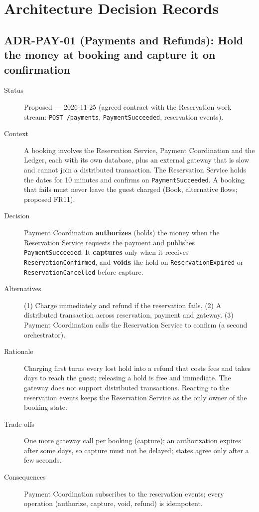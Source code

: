 \section{Architecture Decision Records}




\begingroup
\setlength{\emergencystretch}{3em}
\subsection{ADR-PAY-01 (Payments and Refunds): Hold the money at booking and capture it on confirmation}
\begin{description}
  \item[Status] Proposed --- 2026-11-25 (agreed contract with the Reservation
    work stream: \texttt{POST /payments}, \texttt{Payment\allowbreak Succeeded},
    reservation events).
  \item[Context] A booking involves the Reservation Service, Payment
    Coordination and the Ledger, each with its own database, plus an external
    gateway that is slow and cannot join a distributed transaction. The
    Reservation Service holds the dates for 10 minutes and confirms on
    \texttt{Payment\allowbreak Succeeded}. A booking that fails must never leave the
    guest charged (Book, alternative flows; proposed FR11).
  \item[Decision] Payment Coordination \textbf{authorizes} (holds) the money
    when the Reservation Service requests the payment and publishes
    \texttt{Payment\allowbreak Succeeded}. It \textbf{captures} only when it receives
    \texttt{Reservation\allowbreak Confirmed}, and \textbf{voids} the hold on
    \texttt{Reservation\allowbreak Expired} or \texttt{Reservation\allowbreak Cancelled} before
    capture.
  \item[Alternatives] (1) Charge immediately and refund if the reservation
    fails. (2) A distributed transaction across reservation, payment and
    gateway. (3) Payment Coordination calls the Reservation Service to
    confirm (a second orchestrator).
  \item[Rationale] Charging first turns every lost hold into a refund that
    costs fees and takes days to reach the guest; releasing a hold is free and
    immediate. The gateway does not support distributed transactions. Reacting
    to the reservation events keeps the Reservation Service as the only owner
    of the booking state.
  \item[Trade-offs] One more gateway call per booking (capture); an
    authorization expires after some days, so capture must not be delayed;
    states agree only after a few seconds.
  \item[Consequences] Payment Coordination subscribes to the reservation
    events; every operation (authorize, capture, void, refund) is idempotent.
\end{description}
\endgroup


